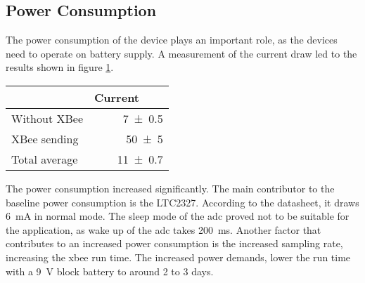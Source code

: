 \subsection{Power Consumption}
The power consumption of the device plays an important role, as the devices need to operate on battery supply.
A measurement of the current draw led to the results shown in figure \ref{tab:frontend:new:power}.
\begin{table}[h!]
	\centering
	\begin{tabular}{lr}
		\hline
		 & Current \SI[per-mode=symbol]{}{\per\milli\amp}\\ \hline
		Without XBee & \SI{7\pm0.5}{} \\
		XBee sending & \SI{50\pm5}{} \\
		Total average & \SI{11\pm0.7}{}\\
		\hline
	\end{tabular}
	\label{tab:frontend:new:power}
\end{table}
The power consumption increased significantly. The main contributor to the baseline power consumption is the LTC2327. According to the datasheet, it draws \SI{6}{\milli\ampere} in normal mode. The sleep mode of the \ac{adc} proved not to be suitable for the application, as wake up of the \ac{adc} takes \SI{200}{\milli\second}.
Another factor that contributes to an increased power consumption is the increased sampling rate, increasing the \acs{xbee} run time. 
The increased power demands, lower the run time with a \SI{9}{\volt} block battery to around 2 to 3 days.

